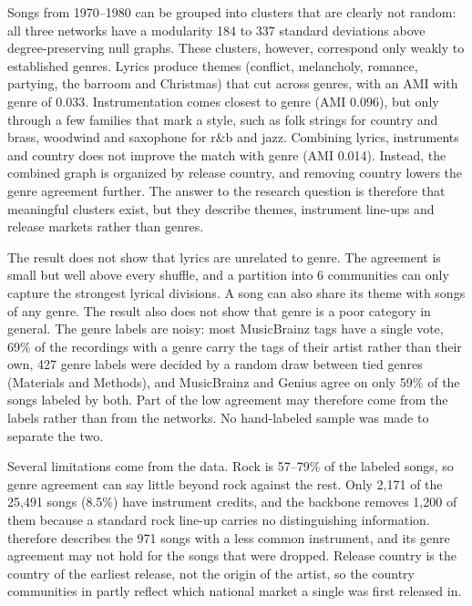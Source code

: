 Songs from 1970--1980 can be grouped into clusters that are clearly not random: all three networks have a modularity 184 to 337 standard deviations above degree-preserving null graphs. These clusters, however, correspond only weakly to established genres. Lyrics produce themes (conflict, melancholy, romance, partying, the barroom and Christmas) that cut across genres, with an AMI with genre of 0.033. Instrumentation comes closest to genre (AMI 0.096), but only through a few families that mark a style, such as folk strings for country and brass, woodwind and saxophone for r\&b and jazz. Combining lyrics, instruments and country does not improve the match with genre (AMI 0.014). Instead, the combined graph is organized by release country, and removing country lowers the genre agreement further. The answer to the research question is therefore that meaningful clusters exist, but they describe themes, instrument line-ups and release markets rather than genres.

The result does not show that lyrics are unrelated to genre. The agreement is small but well above every shuffle, and a partition into 6 communities can only capture the strongest lyrical divisions. A song can also share its theme with songs of any genre. The result also does not show that genre is a poor category in general. The genre labels are noisy: most MusicBrainz tags have a single vote, 69\% of the recordings with a genre carry the tags of their artist rather than their own, 427 genre labels were decided by a random draw between tied genres (Materials and Methods), and MusicBrainz and Genius agree on only 59\% of the songs labeled by both. Part of the low agreement may therefore come from the labels rather than from the networks. No hand-labeled sample was made to separate the two.

Several limitations come from the data. Rock is 57--79\% of the labeled songs, so genre agreement can say little beyond rock against the rest. Only 2,171 of the 25,491 songs (8.5\%) have instrument credits, and the backbone removes 1,200 of them because a standard rock line-up carries no distinguishing information. \Ginst{} therefore describes the 971 songs with a less common instrument, and its genre agreement may not hold for the songs that were dropped. Release country is the country of the earliest release, not the origin of the artist, so the country communities in \Gcomb{} partly reflect which national market a single was first released in.

